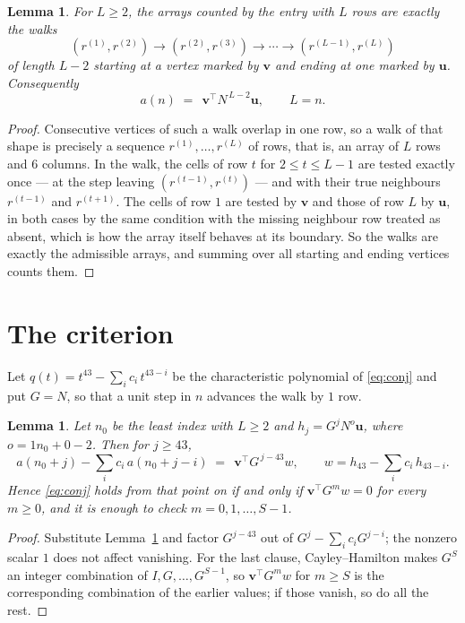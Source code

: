 \documentclass[11pt,a4paper]{article}
\theoremstyle{plain}
\newtheorem{lemma}[theorem]{Lemma}
\theoremstyle{definition}
\begin{document}
\begin{lemma}\label{lem:walk}
For $L\ge2$, the arrays counted by the entry with $L$ rows are exactly the walks
\[
(r^{(1)},r^{(2)})\to(r^{(2)},r^{(3)})\to\cdots\to(r^{(L-1)},r^{(L)})
\]
of length $L-2$ starting at a vertex marked by $\mathbf{v}$ and ending at one marked by
$\mathbf{u}$. Consequently
\[
a(n)\;=\;\,\mathbf{v}^{\!\top}N^{\,L-2}\mathbf{u},\qquad L=n .
\]
\end{lemma}

\begin{proof}
Consecutive vertices of such a walk overlap in one row, so a walk of that shape is
precisely a sequence $r^{(1)},\dots,r^{(L)}$ of rows, that is, an array of $L$ rows
and $6$ columns. In the walk, the cells of row $t$ for $2\le t\le L-1$ are tested
exactly once --- at the step leaving $(r^{(t-1)},r^{(t)})$ --- and with their true
neighbours $r^{(t-1)}$ and $r^{(t+1)}$. The cells of row $1$ are tested by
$\mathbf{v}$ and those of row $L$ by $\mathbf{u}$, in both cases by the same condition
with the missing neighbour row treated as absent, which is how the array itself behaves at
its boundary. So the walks are exactly the admissible arrays, and summing over all starting
and ending vertices counts them.
\end{proof}

\section{The criterion}

Let $q(t)=t^{43}-\sum_i c_i\,t^{43-i}$ be the characteristic polynomial of
\eqref{eq:conj} and put $G=N$, so that a unit step in $n$ advances the walk by
$1$ row.

\begin{lemma}\label{lem:crit}
Let $n_0$ be the least index with $L\ge2$ and $h_j=G^{j}N^{o}\mathbf{u}$, where
$o=1n_0+0-2$. Then for $j\ge43$,
\[
a(n_0+j)-\sum_i c_i\,a(n_0+j-i)\;=\;\,\mathbf{v}^{\!\top}G^{\,j-43}w,
\qquad w=h_{43}-\sum_i c_i\,h_{43-i} .
\]
Hence \eqref{eq:conj} holds from that point on if and only if
$\mathbf{v}^{\!\top}G^{m}w=0$ for every $m\ge0$, and it is enough to check
$m=0,1,\dots,S-1$.
\end{lemma}

\begin{proof}
Substitute Lemma~\ref{lem:walk} and factor $G^{j-43}$ out of
$G^{j}-\sum_ic_iG^{j-i}$; the nonzero scalar $1$ does not affect
vanishing. For the last clause, Cayley--Hamilton makes $G^{S}$ an integer combination of
$I,G,\dots,G^{S-1}$, so $\mathbf{v}^{\!\top}G^{m}w$ for $m\ge S$ is the corresponding
combination of the earlier values; if those vanish, so do all the rest.
\end{proof}
\end{document}
